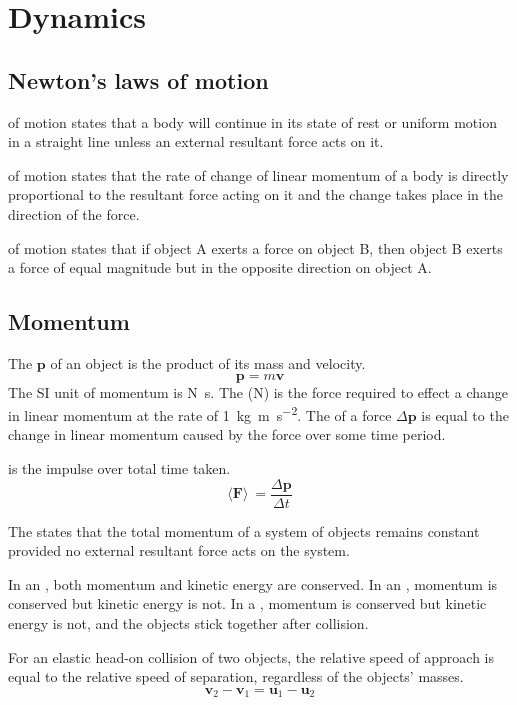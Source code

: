 \documentclass[Physics.tex]{subfiles}
\begin{document}
\chapter{Dynamics}
\section{Newton's laws of motion}
 of motion states that a body will continue in its state of rest or uniform motion in a straight line unless an external resultant force acts on it.

 of motion states that the rate of change of linear momentum of a body is directly proportional to the resultant force acting on it and the change takes place in the direction of the force.

 of motion states that if object A exerts a force on object B, then object B exerts a force of equal magnitude but in the opposite direction on object A.
\section{Momentum}
The  \(\mathbf{p}\) of an object is the product of its mass and velocity. \begin{equation}\mathbf{p} = m\mathbf{v}\end{equation} The SI unit of momentum is \si{\newton\second}. The  (\si{\newton}) is the force required to effect a change in linear momentum at the rate of \SI{1}{\kilogram\metre\per\square\second}. The  of a force \(\Delta\mathbf{p}\) is equal to the change in linear momentum caused by the force over some time period.

 is the impulse over total time taken. \begin{equation}\langle\mathbf{F}\rangle\ = \frac{\Delta\mathbf{p}}{\Delta t}\end{equation}

The  states that the total momentum of a system of objects remains constant provided no external resultant force acts on the system.

In an , both momentum and kinetic energy are conserved. In an , momentum is conserved but kinetic energy is not. In a , momentum is conserved but kinetic energy is not, and the objects stick together after collision.

For an elastic head-on collision of two objects, the relative speed of approach is equal to the relative speed of separation, regardless of the objects' masses. \begin{equation}\mathbf{v}_2 - \mathbf{v}_1 = \mathbf{u}_1 - \mathbf{u}_2\end{equation}
\end{document}
